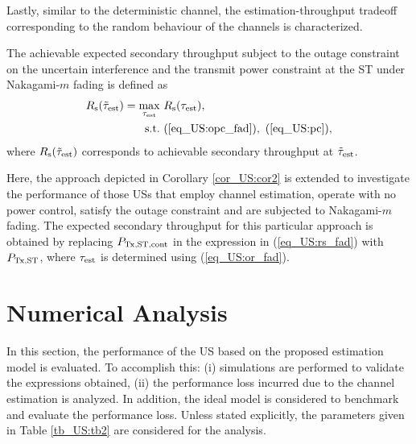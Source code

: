 Lastly, similar to the deterministic channel, the estimation-throughput tradeoff corresponding to the random behaviour of the channels is characterized. 
\begin{theorem} \label{th_US:th2}
\normalfont
The achievable expected secondary throughput subject to the outage constraint on the uncertain interference and the transmit power constraint at the ST under Nakagami-$m$ fading is defined as
\begin{align}
R_{\text{s}}(\tilde{\tau}_{\text{est}}) = \operatorname*{max}_{\tau_{\text{est}}}  & \text{      } {R_{\text{s}}(\tau_{\text{est}})}, 
 \label{eq_US:sys_fad} \\
\text{s.t.} & \text{ } (\ref{eq_US:opc_fad}), \text{  } (\ref{eq_US:pc}), \nonumber 
 \end{align}
where $R_{\text{s}}(\tilde{\tau}_{\text{est}})$ corresponds to achievable secondary throughput at $\tilde{\tau}_{\text{est}}$.  
\end{theorem}

\begin{coro} \label{cor_US:cor3}
\normalfont
Here, the approach depicted in Corollary \ref{cor_US:cor2} is extended to investigate the performance of those USs that employ channel estimation, operate with no power control, satisfy the outage constraint and are subjected to Nakagami-$m$ fading. The expected secondary throughput for this particular approach is obtained by replacing $P_{\text{Tx,ST,cont}}$ in the expression in (\ref{eq_US:rs_fad}) with $P_{\text{Tx,ST}}$, where $\tau_{\text{est}}$ is determined using (\ref{eq_US:or_fad}). 

\end{coro}
 
\section{Numerical Analysis} \label{sec_US:num_ana}
In this section, the performance of the US based on the proposed estimation model is evaluated. To accomplish this: (i) simulations are performed to validate the expressions obtained, (ii) the performance loss incurred due to the channel estimation is analyzed. In addition, the ideal model is considered to benchmark and evaluate the performance loss. %
Unless stated explicitly, the parameters given in Table \ref{tb_US:tb2} are considered for the analysis.%


